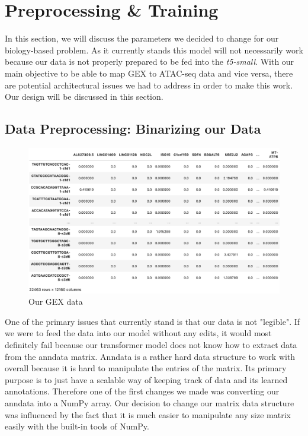 \section{Preprocessing \& Training}

In this section, we will discuss the parameters we decided to change for our biology-based problem. As it currently stands this model will not necessarily work because our data is not properly prepared to be fed into the \emph{t5-small}. With our main objective to be able to map GEX to ATAC-seq data and vice versa, there are potential architectural issues we had to address in order to make this work. Our design will be discussed in this section.

\subsection{Data Preprocessing: Binarizing our Data}

\begin{figure}[H]
\centering
\includegraphics[width=.85\textwidth]{figures/gexdata.jpg}
\caption{Our GEX data}
\end{figure}

One of the primary issues that currently stand is that our data is not "legible". If we were to feed the data into our model without any edits, it would most definitely fail because our transformer model does not know how to extract data from the anndata matrix. Anndata is a rather hard data structure to work with overall because it is hard to manipulate the entries of the matrix. Its primary purpose is to just have a scalable way of keeping track of data and its learned annotations. Therefore one of the first changes we made was converting our anndata into a NumPy array. Our decision to change our matrix data structure was influenced by the fact that it is much easier to manipulate any size matrix easily with the built-in tools of NumPy. 

